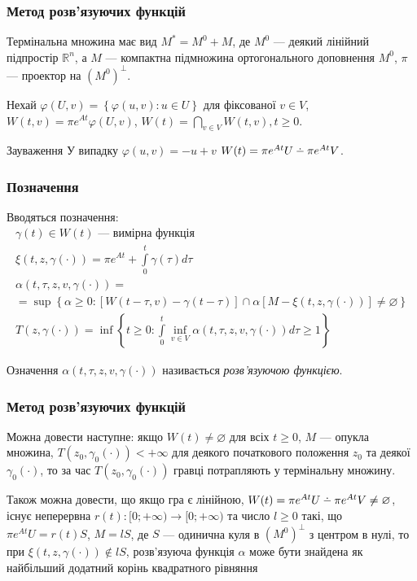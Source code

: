 \documentclass[10pt,pdf]{beamer}
\newcommand{\R}{\mathbb{R}}
\newcommand{\vf}{\varphi}
\renewcommand{\l}{\left}
\renewcommand{\r}{\right}
\newcommand{\intl}{\int\limits}
\def\setdif{\mathbin{\ooalign{\hss\raise1ex\hbox{.}\hss\cr
  \mathsurround=0pt$-$}}}
\begin{document}
    \begin{frame}
        \frametitle{Метод розв’язуючих функцій}
    
        Термінальна множина має вид $M^* = M^0 + M$, де
        $M^0$ --- деякий лінійний підпростір $\R^n$, а $M$ --- компактна підмножина ортогонального доповнення $M^0$,
        $\pi$ --- проектор на $(M^0)^\perp$.

        Нехай $\vf(U, v) = \l\{\vf(u,v) : u \in U\r\}$ для фіксованої $v \in V$,
        $W(t, v) = \pi e^{At} \vf(U, v)$,
        $W(t) = \bigcap\limits_{v \in V} W(t, v), t\geq 0$. 
        \begin{block}{Зауваження}
            У випадку $\vf(u,v) = -u + v$ $W(t) = \pi e^{At}U \setdif \pi e^{At} V$.
        \end{block}
    
    \end{frame}
    \begin{frame}
        \frametitle{Позначення}
    
        Вводяться позначення:
        \begin{gather*}
            \gamma(t) \in W(t) \text{ --- вимірна функція} \\
            \xi(t, z, \gamma(\cdot)) = \pi e^{A t} + \intl_0^t \gamma(\tau) d\tau \\
            \alpha(t, \tau, z, v, \gamma(\cdot)) = \\ = \sup\l\{ 
                \alpha \geq 0 : \l[ W(t-\tau, v) - \gamma(t-\tau)\r] \cap \alpha
                \l[M - \xi(t, z, \gamma(\cdot))\r] \neq \varnothing
            \r\} \\
            T(z, \gamma(\cdot)) = \inf \l\{ 
                t\geq 0: \intl_0^t \underset{v\in V}{\inf} \alpha(t, \tau, z, v, \gamma(\cdot)) d\tau \geq 1
            \r\}
        \end{gather*}

        \begin{block}{Означення}
            $\alpha(t, \tau, z, v, \gamma(\cdot))$ називається \emph{розв'язуючою функцією}.
        \end{block}
    \end{frame}
    \begin{frame}
        \frametitle{Метод розв’язуючих функцій}
    
        Можна довести наступне: якщо $W(t) \neq \varnothing$ для всіх $t\geq 0$,
        $M$ --- опукла множина, $T(z_0, \gamma_0(\cdot)) < +\infty$ для деякого початкового положення
        $z_0$ та деякої $\gamma_0(\cdot)$, то за час $T(z_0, \gamma_0(\cdot))$ гравці потрапляють у термінальну множину.

        Також можна довести, що якщо гра є лінійною,
        $W(t) = \pi e^{At}U \setdif \pi e^{At} V \neq \varnothing$, існує неперервна 
        $r(t): [0; +\infty) \to [0; +\infty)$ та число $l \geq 0$ такі, що
        $\pi e^{A t}U = r(t) S$, $M = l S$, де $S$ --- одинична куля в $(M^0)^\perp$ з центром в нулі, то
        при $\xi(t, z, \gamma(\cdot)) \notin l S$, розв'язуюча функція $\alpha$ може бути знайдена як найбільший додатний корінь квадратного рівняння
    
    \end{frame}
\end{document}
